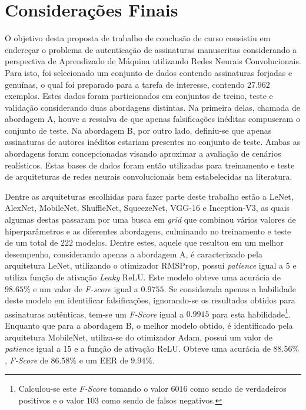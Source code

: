
\chapter{Considerações Finais} \label{cap:consideracoes}

O objetivo desta proposta de trabalho de conclusão de curso consistiu em endereçar o problema de autenticação de assinaturas manuscritas considerando a perspectiva de Aprendizado de Máquina utilizando Redes Neurais Convolucionais. Para isto, foi selecionado um conjunto de dados contendo assinaturas forjadas e genuínas, o qual foi preparado para a tarefa de interesse, contendo $27.962$ exemplos. Estes dados foram particionados em conjuntos de treino, teste e validação considerando duas abordagens distintas. Na primeira delas, chamada de abordagem A, houve a ressalva de que apenas falsificações inéditas compuseram o conjunto de teste. Na abordagem B, por outro lado, definiu-se que apenas assinaturas de autores inéditos estariam presentes no conjunto de teste. Ambas as abordagens foram concepcionadas visando aproximar a avaliação de cenários realísticos. Estas bases de dados foram então utilizadas para treinamento e teste de arquiteturas de redes neurais convolucionais bem estabelecidas na literatura.

Dentre as arquiteturas escolhidas para fazer parte deste trabalho estão a LeNet, AlexNet, MobileNet, ShuffleNet, SqueezeNet, VGG-16 e Inception-V3, as quais algumas destas passaram por uma busca em \emph{grid} que combinou vários valores de hiperparâmetros e as diferentes abordagens, culminando no treinamento e teste de um total de $222$ modelos. Dentre estes, aquele que resultou em um melhor desempenho, considerando apenas a abordagem A, é caracterizado pela arquitetura LeNet, utilizando o otimizador RMSProp, possui \emph{patience} igual a 5 e utiliza função de ativação \emph{Leaky} ReLU. Este modelo obteve uma acurácia de $98.65\%$ e um valor de \emph{F-score} igual a $0.9755$. Se considerada apenas a habilidade deste modelo em identificar falsificações, ignorando-se os resultados obtidos para assinaturas autênticas, tem-se um \emph{F-Score} igual a $0.9915$ para esta habilidade\footnote{Calculou-se este \emph{F-Score} tomando o valor $6016$ como sendo de verdadeiros positivos e o valor $103$ como sendo de falsos negativos.}. Enquanto que para a abordagem B, o melhor modelo obtido, é identificado pela arquitetura MobileNet, utiliza-se do otimizador Adam, possui um valor de \emph{patience} igual a 15 e a função de ativação ReLU. Obteve uma acurácia de $88.56\%$, \emph{F-Score} de $86.58\%$ e um EER de $9.94\%$.


